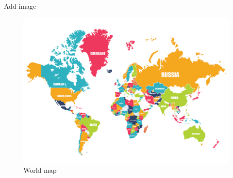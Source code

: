 \documentclass{beamer}
\begin{document}
\begin{frame}{Add image}	

	\begin{figure}
		\centering
		\includegraphics[width=.8\linewidth]{img/world-map}
		\caption{World map}
		\label{fig:world-map}
	\end{figure}
	
\end{frame}
\end{document}
